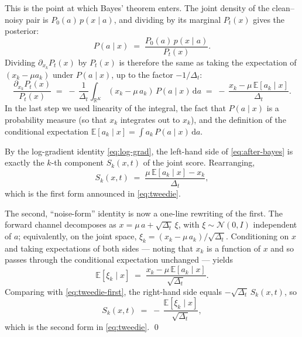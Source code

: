 \documentclass[11pt]{article}
\theoremstyle{definition}
\newcommand{\R}{\mathbb{R}}
\newcommand{\E}{\mathbb{E}}
\newcommand{\Detl}{\Delta_t}
\begin{document}
\begin{derivation}
This is the point at which Bayes' theorem enters. The joint density of
the clean--noisy pair is \(P_0(a)\, p(x \mid a)\), and dividing by
its marginal \(P_t(x)\) gives the posterior:
\begin{equation}\label{eq:bayes}
    P(a \mid x)
    \;=\;
    \frac{P_0(a)\, p(x \mid a)}{P_t(x)}.
\end{equation}
Dividing \(\partial_{x_k} P_t(x)\) by \(P_t(x)\) is therefore the same
as taking the expectation of \((x_k - \mu a_k)\) under \(P(a \mid x)\),
up to the factor \(-1/\Detl\):
\begin{equation}\label{eq:after-bayes}
    \frac{\partial_{x_k} P_t(x)}{P_t(x)}
    \;=\;
    -\,\frac{1}{\Detl}
    \int_{\R^K}
    (x_k - \mu\, a_k)\, P(a \mid x)\, \mathrm d a
    \;=\;
    -\,\frac{x_k - \mu\, \E[a_k \mid x]}{\Detl}.
\end{equation}
In the last step we used linearity of the integral, the fact that
\(P(a \mid x)\) is a probability measure (so that \(x_k\) integrates
out to \(x_k\)), and the definition of the conditional expectation
\(\E[a_k \mid x] = \int a_k\, P(a \mid x)\, \mathrm d a\).

By the log-gradient identity \eqref{eq:log-grad}, the left-hand side of
\eqref{eq:after-bayes} is exactly the \(k\)-th component \(S_k(x, t)\)
of the joint score. Rearranging,
\begin{equation}\label{eq:tweedie-first}
    S_k(x, t)
    \;=\;
    \frac{\mu\, \E[a_k \mid x] - x_k}{\Detl},
\end{equation}
which is the first form announced in \eqref{eq:tweedie}.

The second, ``noise-form'' identity is now a one-line rewriting of the
first. The forward channel decomposes as
\(x = \mu\, a + \sqrt{\Detl}\, \xi\), with \(\xi \sim \mathcal N(0, I)\)
independent of \(a\); equivalently, on the joint space,
\(\xi_k = (x_k - \mu\, a_k) / \sqrt{\Detl}\). Conditioning on \(x\) and
taking expectations of both sides --- noting that \(x_k\) is a function
of \(x\) and so passes through the conditional expectation unchanged ---
yields
\begin{equation}
    \E[\xi_k \mid x]
    \;=\;
    \frac{x_k - \mu\, \E[a_k \mid x]}{\sqrt{\Detl}}.
\end{equation}
Comparing with \eqref{eq:tweedie-first}, the right-hand side equals
\(-\sqrt{\Detl}\, S_k(x, t)\), so
\begin{equation}
    S_k(x, t)
    \;=\;
    -\,\frac{\E[\xi_k \mid x]}{\sqrt{\Detl}},
\end{equation}
which is the second form in \eqref{eq:tweedie}. \qed
\end{derivation}
\end{document}
